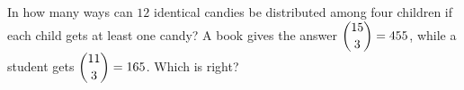 In how many ways can $12$ identical candies be distributed among four children if each child gets at least one candy? A book gives the answer $\dbinom{15}{3}=455$, while a student gets $\dbinom{11}{3}=165$. Which is right?
